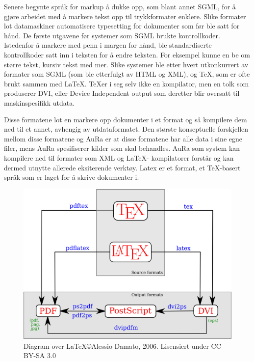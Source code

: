 \documentclass[norsk, 11pt, a4paper]{article}
\begin{document}
Senere begynte språk for markup å dukke opp, som blant annet SGML\cite{SGML-ROOTS}, for å gjøre arbeidet med å markere tekst opp til trykkformater enklere.
Slike formater lot datamaskiner automatisere typesetting for dokumenter som før ble satt for hånd. De første utgavene før systemer som SGML brukte kontrollkoder. Istedenfor å markere med penn i margen for hånd, ble standardiserte kontrollkoder satt inn i teksten for å endre teksten. For eksempel kunne en be om større tekst, kursiv tekst med mer. Slike systemer ble etter hvert utkonkurrert av formater som SGML (som ble etterfulgt av HTML og XML), og \TeX , som er ofte brukt sammen med \LaTeX . \TeX er i seg selv ikke en kompilator, men en tolk\cite{TEX-HISTORY} som produserer DVI, eller Device Independent output som deretter blir oversatt til maskinspesifikk utdata.

Disse formatene lot en markere opp dokumenter i et format og så kompilere dem ned til et annet, avhengig av utdataformatet. Den største konseptuelle forskjellen mellom disse formatene og AuRa er at disse formatene har alle data i sine egne filer, mens AuRa spesifiserer kilder som skal behandles. AuRa som system kan kompilere ned til formater som XML og \LaTeX - kompilatorer forstår og kan dermed utnytte allerede eksiterende verktøy. Latex er et format, et \TeX -basert språk som er laget for å skrive dokumenter i.

\begin{figure}
    \centering
    \includegraphics[width=1\textwidth]{diagrammer/latex-oversikt.png}
    \caption{Diagram over \LaTeX \copyright Alessio Damato, 2006. Lisensiert under CC BY-SA 3.0}
    \label{fig:Latex-oversikt}
\end{figure}
\end{document}
